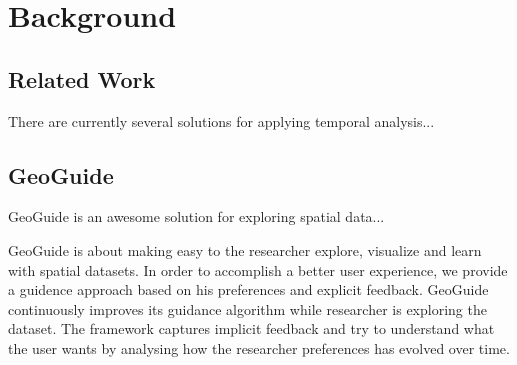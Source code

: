 \chapter{Background}
\label{chap:background}

\section{Related Work}

There are currently several solutions for applying temporal analysis...

\section{GeoGuide}

GeoGuide is an awesome solution for exploring spatial data...

GeoGuide is about making easy to the researcher explore, visualize and learn with spatial datasets.
In order to accomplish a better user experience, we provide a guidence approach based
on his preferences and explicit feedback.
GeoGuide continuously improves its guidance algorithm while
researcher is exploring the dataset. The framework captures implicit feedback
and try to understand what the user wants by analysing how the
researcher preferences has evolved over time.

